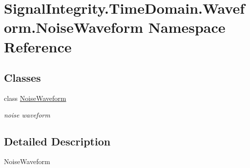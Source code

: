 \hypertarget{namespaceSignalIntegrity_1_1TimeDomain_1_1Waveform_1_1NoiseWaveform}{}\section{Signal\+Integrity.\+Time\+Domain.\+Waveform.\+Noise\+Waveform Namespace Reference}
\label{namespaceSignalIntegrity_1_1TimeDomain_1_1Waveform_1_1NoiseWaveform}
\subsection*{Classes}
\begin{DoxyCompactItemize}
\item 
class \hyperlink{classSignalIntegrity_1_1TimeDomain_1_1Waveform_1_1NoiseWaveform_1_1NoiseWaveform}{Noise\+Waveform}
\begin{DoxyCompactList}\small\item\em noise waveform \end{DoxyCompactList}\end{DoxyCompactItemize}


\subsection{Detailed Description}
\begin{DoxyVerb}NoiseWaveform\end{DoxyVerb}
 